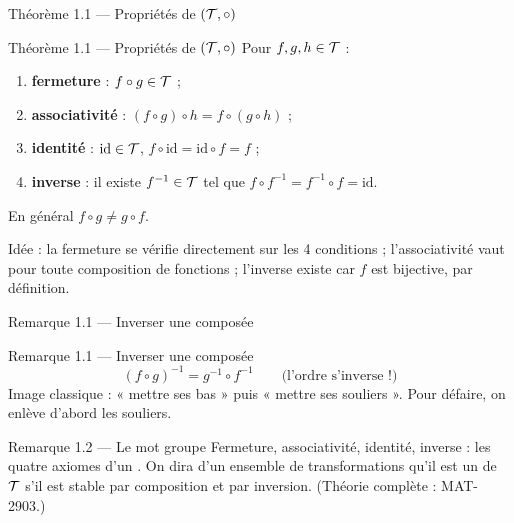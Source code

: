 \begin{frame}{Théorème 1.1 --- Propriétés de $(\mathcal{T}, \circ)$}
  \begin{Enonce}{Théorème 1.1 --- Propriétés de $(\mathcal{T}, \circ)$}
    \small Pour $f,g,h \in \mathcal{T}$ :
    \begin{enumerate}
      \item[(i)] \textbf{fermeture} : $f \circ g \in \mathcal{T}$ ;
      \item[(ii)] \textbf{associativité} : $(f\circ g)\circ h = f\circ(g\circ h)$ ;
      \item[(iii)] \textbf{identité} : $\mathrm{id} \in \mathcal{T}$,
        $f \circ \mathrm{id} = \mathrm{id} \circ f = f$ ;
      \item[(iv)] \textbf{inverse} : il existe $f^{-1}\in\mathcal{T}$ tel
        que $f\circ f^{-1} = f^{-1}\circ f = \mathrm{id}$.
    \end{enumerate}
    En général $f \circ g \neq g \circ f$.
  \end{Enonce}
  \begin{AuTableau}
    \small Idée : la fermeture se vérifie directement sur les 4
    conditions ; l'associativité vaut pour toute composition de
    fonctions ; l'inverse existe car $f$ est bijective, par
    définition.
  \end{AuTableau}
\end{frame}

\begin{frame}{Remarque 1.1 --- Inverser une composée}
  \begin{Rem}{Remarque 1.1 --- Inverser une composée}
    \[
      (f \circ g)^{-1} = g^{-1} \circ f^{-1} \qquad\text{(l'ordre s'inverse !)}
    \]
    Image classique : « mettre ses bas » puis « mettre ses souliers ».
    Pour défaire, on enlève d'abord les souliers.
  \end{Rem}
  \vspace{10pt}
  \begin{Rem}{Remarque 1.2 --- Le mot groupe}
    Fermeture, associativité, identité, inverse : les quatre axiomes
    d'un . On dira d'un ensemble de transformations qu'il
    est un  de $\mathcal{T}$ s'il est stable par
    composition et par inversion. (Théorie complète : MAT-2903.)
  \end{Rem}
\end{frame}

